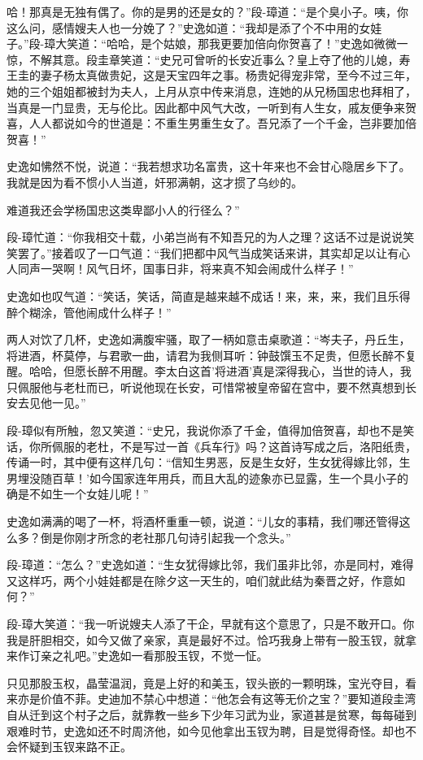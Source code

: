\documentclass[12pt,oneside]{book}
\begin{document}
哈！那真是无独有偶了。你的是男的还是女的？''段-璋道：``是个臭小子。咦，你这么问，感情嫂夫人也一分娩了？''史逸如道：``我却是添了个不中用的女娃子。''段-璋大笑道：``哈哈，是个姑娘，那我更要加倍向你贺喜了！''史逸如微微一惊，不解其意。段圭章笑道：``史兄可曾听的长安近事么？皇上夺了他的儿媳，寿王圭的妻子杨太真做贵妃，这是天宝四年之事。杨贵妃得宠非常，至今不过三年，她的三个姐姐都被封为夫人，上月从京中传来消息，连她的从兄杨国忠也拜相了，当真是一门显贵，无与伦比。因此都中风气大改，一听到有人生女，戚友便争来贺喜，人人都说如今的世道是：不重生男重生女了。吾兄添了一个千金，岂非要加倍贺喜！''

史逸如怫然不悦，说道：``我若想求功名富贵，这十年来也不会甘心隐居乡下了。我就是因为看不惯小人当道，奸邪满朝，这才掼了乌纱的。

难道我还会学杨国忠这类卑鄙小人的行径么？''

段-璋忙道：``你我相交十载，小弟岂尚有不知吾兄的为人之理？这话不过是说说笑笑罢了。''接着叹了一口气道：``我们把都中风气当成笑话来讲，其实却足以让有心人同声一哭啊！风气日坏，国事日非，将来真不知会闹成什么样子！''

史逸如也叹气道：``笑话，笑话，简直是越来越不成话！来，来，来，我们且乐得醉个糊涂，管他闹成什么样子！''

两人对饮了几杯，史逸如满腹牢骚，取了一柄如意击桌歌道：``岑夫子，丹丘生，将进酒，杯莫停，与君歌一曲，请君为我侧耳听：钟鼓馔玉不足贵，但愿长醉不复醒。哈哈，但愿长醉不用醒。李太白这首'将进酒'真是深得我心，当世的诗人，我只佩服他与老杜而已，听说他现在长安，可惜常被皇帝留在宫中，要不然真想到长安去见他一见。''

段-璋似有所触，忽又笑道：``史兄，我说你添了千金，值得加倍贺喜，却也不是笑话，你所佩服的老杜，不是写过一首《兵车行》吗？这首诗写成之后，洛阳纸贵，传诵一时，其中便有这样几句：``信知生男恶，反是生女好，生女犹得嫁比邻，生男埋没随百草！'如今国家连年用兵，而且大乱的迹象亦已显露，生一个具小子的确是不如生一个女娃儿呢！''

史逸如满满的喝了一杯，将酒杯重重一顿，说道：``儿女的事精，我们哪还管得这么多？倒是你刚才所念的老社那几句诗引起我一个念头。''

段-璋道：``怎么？''史逸如道：``生女犹得嫁比邻，我们虽非比邻，亦是同村，难得又这样巧，两个小娃娃都是在除夕这一天生的，咱们就此结为秦晋之好，作意如何？''

段-璋大笑道：``我一听说嫂夫人添了干企，早就有这个意思了，只是不敢开口。你我是肝胆相交，如今又做了亲家，真是最好不过。恰巧我身上带有一股玉钗，就拿来作订亲之礼吧。''史逸如一看那股玉钗，不觉一怔。

只见那股玉权，晶莹温润，竟是上好的和美玉，钗头嵌的一颗明珠，宝光夺目，看来亦是价值不菲。史迪加不禁心中想道：``他怎会有这等无价之宝？''要知道段圭湾自从迁到这个村子之后，就靠教一些乡下少年习武为业，家道甚是贫寒，每每碰到艰难时节，史逸如还不时周济他，如今见他拿出玉钗为聘，目是觉得奇怪。却也不会怀疑到玉钗来路不正。
\end{document}
